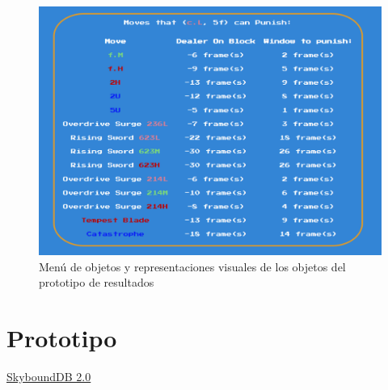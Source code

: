 \begin{center}
    \begin{figure}
        \centering
        \includegraphics[height=0.4\textheight]{figures/Results_menu-object.png}
        \caption{Menú de objetos y representaciones visuales de los objetos del prototipo de resultados}
        \label{fig: rslt prt}
    \end{figure}  
\end{center}

\newpage

\section{Prototipo}

\href{https://aramis-matos.github.io/skyboundDB2.0/}{SkyboundDB 2.0}